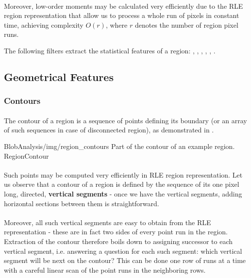 \paragraph*{}
Moreover, low-order moments may be calculated very efficiently due to the RLE region representation that allow us to process a whole run of pixels in constant time, achieving complexity $O(r)$, where $r$ denotes the number of region pixel runs.

\begin{refImpl}
The following \studio filters extract the statistical features of a region: 
, 
, 
, 
,
,
. 
\end{refImpl}

\subsection{Geometrical Features}

\subsubsection{Contours}

\paragraph*{}
The contour of a region is a sequence of points defining its boundary (or an array of such sequences in case of disconnected region), as demonstrated in .

\oneFigure
{BlobAnalysis/img/region_contours}
{Part of the contour of an example region.}
{RegionContour}
{\basicWidth}

\paragraph*{}
Such points may be computed very efficiently in RLE region representation. Let us observe that a contour of a region is defined by the sequence of its one pixel long, directed, \textbf{vertical segments} - once we have the vertical segments, adding horizontal sections between them is straightforward. 

\paragraph*{}
Moreover, all such vertical segments are easy to obtain from the RLE representation - these are in fact two sides of every point run in the region. Extraction of the contour therefore boils down to assigning successor to each vertical segment, i.e. answering a question for each such segment: which vertical segment will be next on the contour? This can be done one row of runs at a time with a careful linear scan of the point runs in the neighboring rows.

